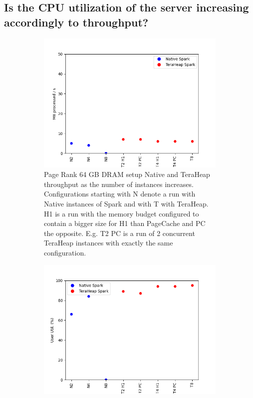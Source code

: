 \subsection{Is the CPU utilization of the server increasing
accordingly to throughput?}
\begin{figure}[htbp]
	\centering
	\begin{subfigure}[b]{0.48\textwidth}
        \includegraphics[width=\linewidth]{./fig/PR_64_THR.png}
    \caption{Page Rank 64 GB DRAM setup Native and TeraHeap throughput
    as the number of instances increases. Configurations starting with
    N denote a run with Native instances of Spark and with T with
    TeraHeap. H1 is a run with the memory budget configured to contain
    a bigger size for H1 than PageCache and PC the opposite. E.g. T2
    PC is a run of 2 concurrent TeraHeap instances with exactly the
    same configuration.}
\label{fig:pr_64_thr}
\end{subfigure}
        \begin{subfigure}[b]{0.48\textwidth}
        \includegraphics[width=\linewidth]{./fig/PR_64_USR.png}

\end{subfigure}
\end{figure}

